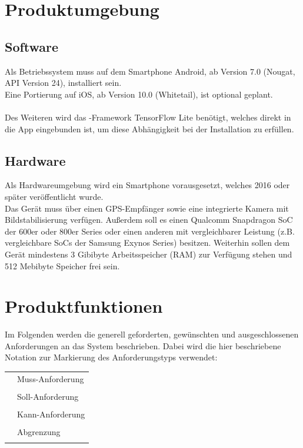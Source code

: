 \documentclass[12pt,a4paper,ngerman,enabledeprecatedfontcommands]{scrreprt}
\begin{document}
\chapter{Produktumgebung}
\section{Software}
Als Betriebssystem muss auf dem \gls{Smartphone} Android, ab Version 7.0 (Nougat, \gls{API} Version 24), installiert sein.\\
Eine Portierung auf iOS, ab Version 10.0 (Whitetail), ist optional geplant.\\
\\
Des Weiteren wird das -Framework \glqq \gls{TensorFlow Lite}\grqq{} benötigt, welches direkt in die \gls{App} eingebunden ist, um diese Abhängigkeit bei der Installation zu erfüllen.\\

\section{Hardware}
\label{chap:hardware}
Als Hardwareumgebung wird ein \gls{Smartphone} vorausgesetzt, welches 2016 oder später veröffentlicht wurde.\\
Das Gerät muss über einen GPS-Empfänger sowie eine integrierte Kamera mit Bildstabilisierung verfügen.
Außerdem soll es einen Qualcomm Snapdragon \gls{SoC} der 600er oder 800er Series oder einen anderen mit vergleichbarer Leistung (z.B. vergleichbare \gls{SoC}s der Samsung Exynos Series) besitzen. Weiterhin sollen dem Gerät mindestens 3 Gibibyte Arbeitsspeicher (RAM) zur Verfügung stehen und 512 Mebibyte Speicher frei sein.\\

\chapter{Produktfunktionen}
\label{chap:produktfunk}
Im Folgenden werden die generell geforderten, gewünschten und ausgeschlossenen Anforderungen an das \gls{System} beschrieben. Dabei wird die hier beschriebene Notation zur Markierung des Anforderungstyps verwendet:

\begin{longtabu}{l X[l]}
\mustref{~} & Muss-Anforderung\\
&\\
\shouldref{~} & Soll-Anforderung\\
&\\
\couldref{~} & Kann-Anforderung\\
&\\
\wontref{~} & Abgrenzung\\
&\\
\end{longtabu}
\end{document}
